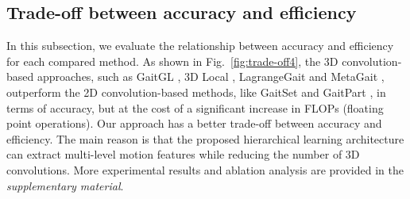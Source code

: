 \documentclass[10pt,twocolumn,letterpaper]{article}
\begin{document}
\subsection{Trade-off between accuracy and efficiency}
\label{sec:trade-off}

 \begin{table}[tb]
  \centering
    \setlength{\abovecaptionskip}{0cm}  %
\setlength{\belowcaptionskip}{-0.2cm} %
  \caption{Ablation study on the effectiveness of ARME, ASTP, and FTA modules in terms of average rank-1 accuracy on the CASIA-B dataset.}
  \label{tab:impact}%
\end{table}%
In this subsection, we evaluate the relationship between accuracy and efficiency for each compared method. As shown in Fig.~\ref{fig:trade-off4}, the 3D convolution-based approaches, such as GaitGL \cite{lin2021gait}, 3D Local \cite{huang20213d}, LagrangeGait \cite{chai2022lagrange} and MetaGait \cite{dou2022metagait}, outperform the 2D convolution-based methods, like GaitSet \cite{chao2019gaitset} and GaitPart \cite{fan2020gaitpart}, in terms of accuracy, but at the cost of a significant increase in FLOPs (floating point operations). Our approach has a better trade-off between accuracy and efficiency.  The main reason is that the proposed hierarchical learning architecture can extract multi-level motion features while reducing the number of 3D convolutions. More experimental results and ablation analysis are provided in the \textsl{supplementary material}.
\end{document}
